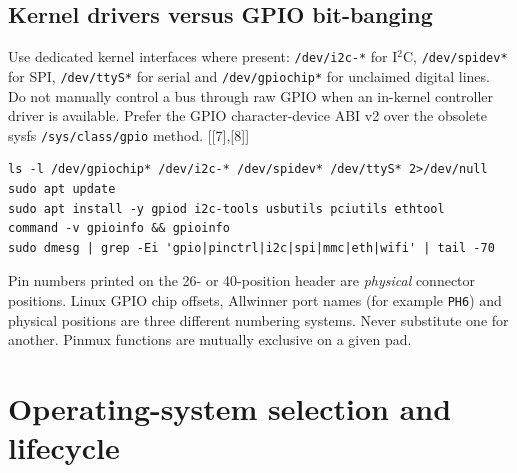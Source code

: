 \documentclass[10pt,oneside,openany]{report}
\newcommand{\code}[1]{\texttt{#1}}
\newcommand{\smallref}[1]{{\sffamily\scriptsize\color{slate}[#1]}}
\begin{document}
\section{Kernel drivers versus GPIO bit-banging}
Use dedicated kernel interfaces where present: \code{/dev/i2c-*} for I\(^{2}\)C, \code{/dev/spidev*} for SPI, \code{/dev/ttyS*} for serial and \code{/dev/gpiochip*} for unclaimed digital lines. Do not manually control a bus through raw GPIO when an in-kernel controller driver is available. Prefer the GPIO character-device ABI v2 over the obsolete sysfs \code{/sys/class/gpio} method. \smallref{[7],[8]}
\begin{lstlisting}[style=sh]
ls -l /dev/gpiochip* /dev/i2c-* /dev/spidev* /dev/ttyS* 2>/dev/null
sudo apt update
sudo apt install -y gpiod i2c-tools usbutils pciutils ethtool
command -v gpioinfo && gpioinfo
sudo dmesg | grep -Ei 'gpio|pinctrl|i2c|spi|mmc|eth|wifi' | tail -70
\end{lstlisting}
\begin{cautionbox}
Pin numbers printed on the 26- or 40-position header are \emph{physical} connector positions. Linux GPIO chip offsets, Allwinner port names (for example \code{PH6}) and physical positions are three different numbering systems. Never substitute one for another. Pinmux functions are mutually exclusive on a given pad.
\end{cautionbox}

\chapter{Operating-system selection and lifecycle}
\end{document}
